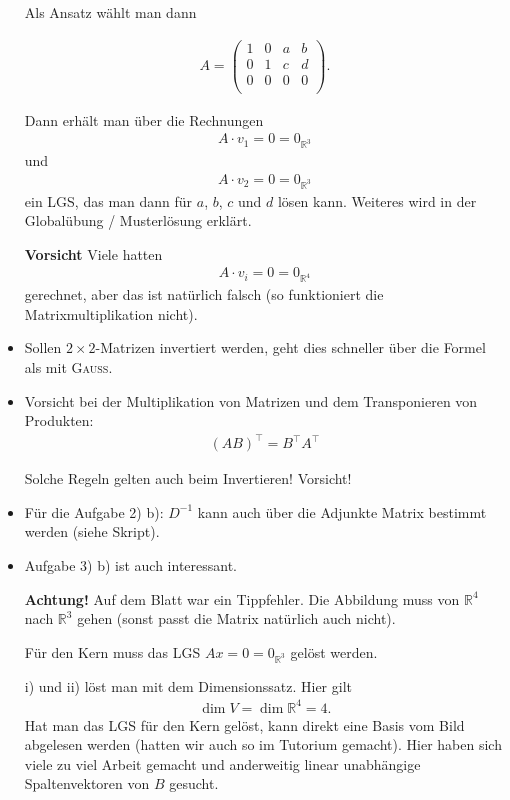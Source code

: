 \documentclass[11pt, a4paper]{article}
\newcommand{\R}{\mathbb{R}}
\begin{document}
\begin{itemize}
Als Ansatz wählt man dann  

\begin{align*}
A = 
\left(
\begin{array}{cccc}
1 & 0 & a & b\\
0 & 1 & c & d\\
0 & 0 & 0 & 0\\
\end{array}
\right).
\end{align*}

Dann erhält man über die Rechnungen 
\begin{align*}
A\cdot v_1 = 0 = 0_{\R^3}
\end{align*}
und
\begin{align*}
A\cdot v_2 = 0 = 0_{\R^3}
\end{align*}
ein LGS, das man dann für $a$, $b$, $c$ und $d$ lösen kann. Weiteres wird in der Globalübung / Musterlösung erklärt.

\textbf{Vorsicht} Viele hatten 
\begin{align*}
A\cdot v_i = 0 = 0_{\R^4}
\end{align*}
gerechnet, aber das ist natürlich falsch (so funktioniert die Matrixmultiplikation nicht).

\item Sollen $2 \times 2$-Matrizen invertiert werden, geht dies schneller über die Formel als mit \textsc{Gauß}.

\item Vorsicht bei der Multiplikation von Matrizen und dem Transponieren von Produkten:
\begin{align*}
(AB)^\intercal = B^\intercal A^\intercal
\end{align*}

Solche Regeln gelten auch beim Invertieren! Vorsicht!

\item Für die Aufgabe 2) b): $D^{-1}$ kann auch über die Adjunkte Matrix bestimmt werden (siehe Skript).

\item Aufgabe 3) b) ist auch interessant. 

\textbf{Achtung!} Auf dem Blatt war ein Tippfehler. Die Abbildung muss von $\R^4$ nach $\R^3$ gehen (sonst passt die Matrix natürlich auch nicht).

Für den Kern muss das LGS $Ax = 0 = 0_{\R^3}$ gelöst werden.

i) und ii) löst man mit dem Dimensionssatz. Hier gilt
\begin{align*}
\dim V = \dim \R^4 = 4.
\end{align*}
Hat man das LGS für den Kern gelöst, kann direkt eine Basis vom Bild abgelesen werden (hatten wir auch so im Tutorium gemacht). Hier haben sich viele zu viel Arbeit gemacht und anderweitig linear unabhängige Spaltenvektoren von $B$ gesucht.


\end{itemize}
\end{document}
